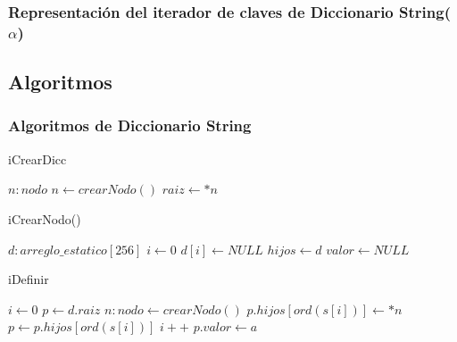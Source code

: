
  \subsubsection{Representaci\'on del iterador de claves de Diccionario String($\alpha$)}

  \begin{comment}
	\Rep[iterador][i]{$i.pos$<longitud($*(i.lista)$)}
	
	\Abs[iterador]{itConjEstNat}[it]{$iConj$}{actual($iConj$) = $a[i]$ $\land$ hayPr\'ox($iConj$)=($i.pos$<longitud($*(i.lista)$)-1) $\land$ \\(hayPr\'ox($i.Conj$)$\Rightarrow$pr\'oximo($iConj$)=Abs(<$i.pos+1, i.lista$>))}
  \end{comment}

  \subsection{Algoritmos}
\subsubsection{Algoritmos de Diccionario String}

\begin{algorithm}
\caption{iCrearDicc}
\label{() -> res = diccString}
\begin{algorithmic}
\State $n : nodo$
\State $n \gets crearNodo()$
\State $raiz \gets *n$
\end{algorithmic}
\end{algorithm}


\begin{algorithm}
\caption{iCrearNodo()}
\label{() -> res = nodo}
\begin{algorithmic}
\State $d : arreglo\_estatico[256]$
\State $i \gets 0$
\State $d[i] \gets NULL$
\EndWhile
\State $hijos \gets d$
\State $valor \gets NULL$
\end{algorithmic}
\end{algorithm}

\begin{algorithm}
\caption{iDefinir}
\label{inout diccString(alfa): d, in string: c, in alfa: s}
\begin{algorithmic}
\State $i \gets 0$
\State $p \gets d.raiz$
\State $n: nodo \gets crearNodo()$
\State $p.hijos[ord(s[i])] \gets *n$
\EndIf
\State $p \gets p.hijos[ord(s[i])]$
\State $i++$
\EndWhile
\State $p.valor \gets a$
\end{algorithmic}
\end{algorithm}

